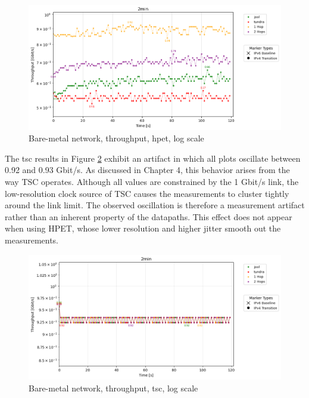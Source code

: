 \begin{figure}[H]
    \centering
    \includegraphics[width=1\textwidth]{resources/finalPlots/combinedplots/DoubleLocal_tcp_sameScale_hpet_2min_log.png}
    \caption{Bare-metal network, throughput, hpet, log scale}
    \label{fig:Dual_tcp_sameScale_hpet_log}
\end{figure}

The tsc results in Figure \ref{fig:Dual_tcp_sameScale_tsc_log} exhibit an artifact in which all plots oscillate between 0.92 and 0.93 Gbit/s. As discussed in Chapter 4, this behavior arises from the way TSC operates. Although all values are constrained by the 1 Gbit/s link, the low-resolution clock source of TSC causes the measurements to cluster tightly around the link limit. The observed oscillation is therefore a measurement artifact rather than an inherent property of the datapaths. This effect does not appear when using HPET, whose lower resolution and higher jitter smooth out the measurements.

\begin{figure}[H]
    \centering
    \includegraphics[width=1\textwidth]{resources/finalPlots/combinedplots/DoubleLocal_tcp_sameScale_tsc_2min_log.png}
    \caption{Bare-metal network, throughput, tsc, log scale}
    \label{fig:Dual_tcp_sameScale_tsc_log}
\end{figure}

